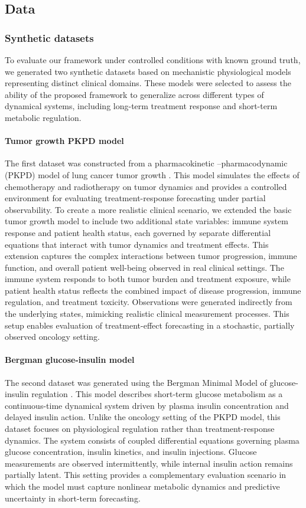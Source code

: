 \documentclass[preprint,12pt]{elsarticle}
\begin{document}
\subsection{Data}

\subsubsection{Synthetic datasets}
To evaluate our framework under controlled conditions with known ground truth, we generated two synthetic datasets based on mechanistic physiological models representing distinct clinical domains. These models were selected to assess the ability of the proposed framework to generalize across different types of dynamical systems, including long-term treatment response and short-term metabolic regulation.

\paragraph{Tumor growth PKPD model}
The first dataset was constructed from a pharmacokinetic --pharmacodynamic (PKPD) model of lung cancer tumor growth \citep{kacprzyk2024ode}. This model simulates the effects of chemotherapy and radiotherapy on tumor dynamics and provides a controlled environment for evaluating treatment-response forecasting under partial observability. To create a more realistic clinical scenario, we extended the basic tumor growth model to include two additional state variables: immune system response and patient health status, each governed by separate differential equations that interact with tumor dynamics and treatment effects. This extension captures the complex interactions between tumor progression, immune function, and overall patient well-being observed in real clinical settings. The immune system responds to both tumor burden and treatment exposure, while patient health status reflects the combined impact of disease progression, immune regulation, and treatment toxicity. Observations were generated indirectly from the underlying states, mimicking realistic clinical measurement processes. This setup enables evaluation of treatment-effect forecasting in a stochastic, partially observed oncology setting.

\paragraph{Bergman glucose-insulin model}
The second dataset was generated using the Bergman Minimal Model of glucose-insulin regulation \citep{bergman1979quantitative}. This model describes short-term glucose metabolism as a continuous-time dynamical system driven by plasma insulin concentration and delayed insulin action. Unlike the oncology setting of the PKPD model, this dataset focuses on physiological regulation rather than treatment-response dynamics. The system consists of coupled differential equations governing plasma glucose concentration, insulin kinetics, and insulin injections. Glucose measurements are observed intermittently, while internal insulin action remains partially latent. This setting provides a complementary evaluation scenario in which the model must capture nonlinear metabolic dynamics and predictive uncertainty in short-term forecasting.
\end{document}
